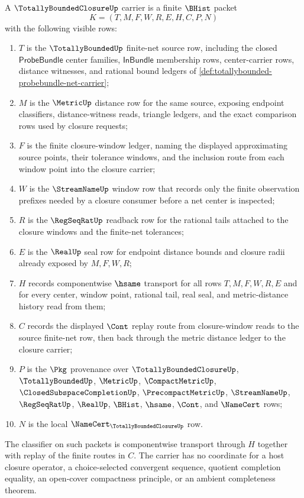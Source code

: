 \begin{definition}
\label{def:totally-bounded-closure-carrier}
A $\TotallyBoundedClosureUp$ carrier is a finite $\BHist$ packet
$$
K=(T,M,F,W,R,E,H,C,P,N)
$$
with the following visible rows:
\begin{enumerate}
\item $T$ is the $\TotallyBoundedUp$ finite-net source row, including the closed $\mathsf{ProbeBundle}$ center families, $\mathsf{InBundle}$ membership rows, center-carrier rows, distance witnesses, and rational bound ledgers of \autoref{def:totallybounded-probebundle-net-carrier};
\item $M$ is the $\MetricUp$ distance row for the same source, exposing endpoint classifiers, distance-witness reads, triangle ledgers, and the exact comparison rows used by closure requests;
\item $F$ is the finite closure-window ledger, naming the displayed approximating source points, their tolerance windows, and the inclusion route from each window point into the closure carrier;
\item $W$ is the $\StreamNameUp$ window row that records only the finite observation prefixes needed by a closure consumer before a net center is inspected;
\item $R$ is the $\RegSeqRatUp$ readback row for the rational tails attached to the closure windows and the finite-net tolerances;
\item $E$ is the $\RealUp$ seal row for endpoint distance bounds and closure radii already exposed by $M,F,W,R$;
\item $H$ records componentwise $\hsame$ transport for all rows $T,M,F,W,R,E$ and for every center, window point, rational tail, real seal, and metric-distance history read from them;
\item $C$ records the displayed $\Cont$ replay route from closure-window reads to the source finite-net row, then back through the metric distance ledger to the closure carrier;
\item $P$ is the $\Pkg$ provenance over $\TotallyBoundedClosureUp$, $\TotallyBoundedUp$, $\MetricUp$, $\CompactMetricUp$, $\ClosedSubspaceCompletionUp$, $\PrecompactMetricUp$, $\StreamNameUp$, $\RegSeqRatUp$, $\RealUp$, $\BHist$, $\hsame$, $\Cont$, and $\NameCert$ rows;
\item $N$ is the local $\NameCert_{\TotallyBoundedClosureUp}$ row.
\end{enumerate}
The classifier on such packets is componentwise transport through $H$ together with replay of the finite routes in $C$. The carrier has no coordinate for a host closure operator, a choice-selected convergent sequence, quotient completion equality, an open-cover compactness principle, or an ambient completeness theorem.
\end{definition}

